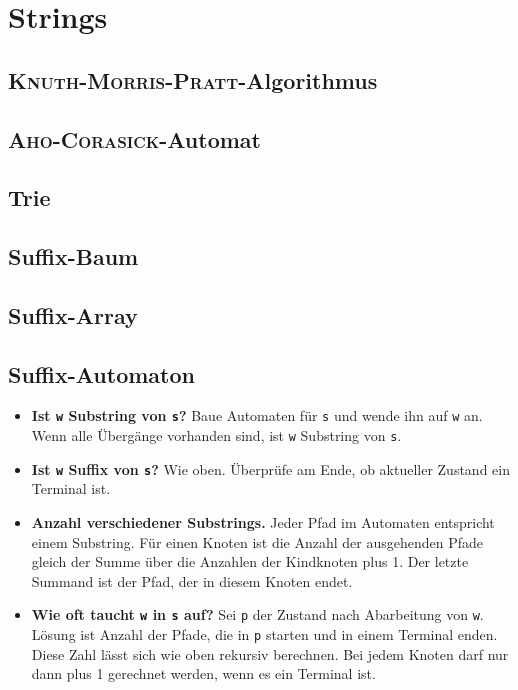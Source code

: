 \section{Strings}

\subsection{\textsc{Knuth-Morris-Pratt}-Algorithmus}


\subsection{\textsc{Aho-Corasick}-Automat}


\subsection{Trie}


\subsection{Suffix-Baum}


\subsection{Suffix-Array}


\subsection{Suffix-Automaton}

\begin{itemize}[nosep]
	\item \textbf{Ist \lstinline{w} Substring von \lstinline{s}?}
	Baue Automaten für \lstinline{s} und wende ihn auf \lstinline{w} an.
	Wenn alle Übergänge vorhanden sind, ist \lstinline{w} Substring von \lstinline{s}.

	\item \textbf{Ist \lstinline{w} Suffix von \lstinline{s}?}
	Wie oben.
	Überprüfe am Ende, ob aktueller Zustand ein Terminal ist.

	\item \textbf{Anzahl verschiedener Substrings.}
	Jeder Pfad im Automaten entspricht einem Substring.
	Für einen Knoten ist die Anzahl der ausgehenden Pfade gleich der Summe über die Anzahlen der Kindknoten plus 1.
	Der letzte Summand ist der Pfad, der in diesem Knoten endet.

	\item \textbf{Wie oft taucht \lstinline{w} in \lstinline{s} auf?}
	Sei \lstinline{p} der Zustand nach Abarbeitung von \lstinline{w}.
	Lösung ist Anzahl der Pfade, die in \lstinline{p} starten und in einem Terminal enden.
	Diese Zahl lässt sich wie oben rekursiv berechnen.
	Bei jedem Knoten darf nur dann plus 1 gerechnet werden, wenn es ein Terminal ist.
\end{itemize}

